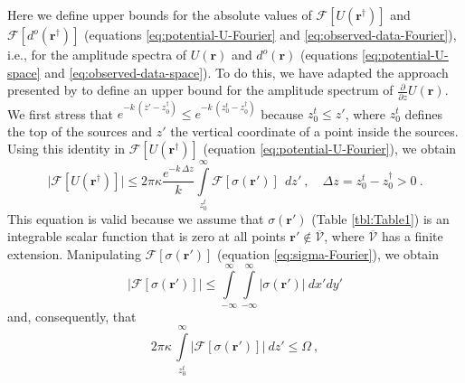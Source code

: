 \documentclass[manuscript,noblind]{geophysics}
\begin{document}
	
	\clearpage
	
	
	
	
	\clearpage
	
	\appendix
	
	\label{app:upper-bounds}
	
	Here we define upper bounds for the absolute values
	of $\mathcal{F} [ U(\mathbf{r}^{\dagger}) ]$ and $\mathcal{F} [ d^{o}(\mathbf{r}^{\dagger}) ]$ 
	(equations \ref{eq:potential-U-Fourier} and \ref{eq:observed-data-Fourier}), 
	i.e., for the amplitude spectra of $U(\mathbf{r})$ and $d^{o}(\mathbf{r})$ 
	(equations \ref{eq:potential-U-space} and \ref{eq:observed-data-space}). 
	To do this, we have adapted the approach presented by
	\citet{bhattacharyya1967} to define an upper bound for the amplitude spectrum of 
	$\tfrac{\partial}{\partial z} U(\mathbf{r})$. 
	We first stress that 
	$e^{- k \, (z' - z^{\dagger}_{0})} \le e^{- k \, (z^{t}_{0} - z^{\dagger}_{0})}$ because
	$z^{t}_{0} \le z'$, where $z^{t}_{0}$ defines the top of the sources and $z'$ the vertical
	coordinate of a point inside the sources. Using this identity in  
	$\mathcal{F} [ U(\mathbf{r}^{\dagger}) ]$ (equation \ref{eq:potential-U-Fourier}), we obtain
	\begin{equation}
		\vert \mathcal{F} [ U(\mathbf{r}^{\dagger}) ] \vert \le 2 \pi \kappa 
		\frac{e^{- k \, \Delta z}}{k}
		\int\limits_{z^{t}_{0}}^{\infty}
		\mathcal{F} [ \sigma(\mathbf{r}') ] \:
		\: dz' \: , \quad \Delta z = z^{t}_{0} - z^{\dagger}_{0} > 0 \: .
		\label{eq:potential-U-spectrum-bound1}
	\end{equation}
	This equation is valid because we assume that $\sigma(\mathbf{r}')$ (Table \ref{tbl:Table1}) 
	is an integrable scalar function that is zero at all points $\mathbf{r}' \notin \overline{\mathcal{V}}$, 
	where $\overline{\mathcal{V}}$ has a finite extension. 
	Manipulating $\mathcal{F} [ \sigma(\mathbf{r}') ]$ (equation \ref{eq:sigma-Fourier}), 
	we obtain
	\begin{equation}
		\vert \mathcal{F} [ \sigma(\mathbf{r}') ] \vert \le
		\int\limits_{-\infty}^{\infty}\int\limits_{-\infty}^{\infty}
		\vert \sigma(\mathbf{r}') \vert 
		\: dx'dy'
		\label{eq:sigma-spectrum-bound}
	\end{equation}
	and, consequently, that
	\begin{equation}
		2 \pi \kappa \, 
		\int\limits_{z^{t}_{0}}^{\infty}
		\vert \mathcal{F} [ \sigma(\mathbf{r}') ] \vert
		\: dz' \le \Omega \: ,
		\label{eq:Omega-bound}
	\end{equation}
\end{document}
